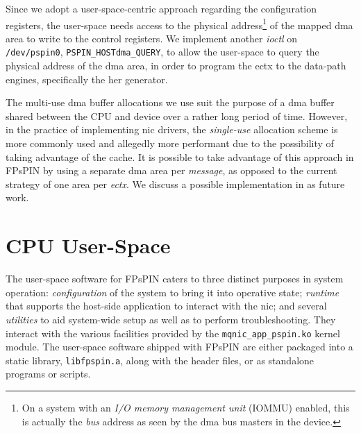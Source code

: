 Since we adopt a user-space-centric approach regarding the configuration registers, the user-space needs access to the physical address\footnote{On a system with an \emph{I/O memory management unit} (IOMMU) enabled, this is actually the \emph{bus} address as seen by the \ac{dma} bus masters in the device.} of the mapped \ac{dma} area to write to the control registers.  We implement another \emph{ioctl} on \texttt{/dev/pspin0}, \texttt{PSPIN\_\-HOST\ac{dma}\_\-QUERY}, to allow the user-space to query the physical address of the \ac{dma} area, in order to program the \ac{ectx} to the data-path engines, specifically the \ac{her} generator.

The multi-use \ac{dma} buffer allocations we use suit the purpose of a \ac{dma} buffer shared between the CPU and device over a rather long period of time.  However, in the practice of implementing \ac{nic} drivers, the \emph{single-use} allocation scheme is more commonly used and allegedly more performant due to the possibility of taking advantage of the cache.  It is possible to take advantage of this approach in FPsPIN by using a separate \ac{dma} area per \emph{message}, as opposed to the current strategy of one area per \emph{\ac{ectx}}.  We discuss a possible implementation in  as future work.

\section{CPU User-Space} \label{sec:sw-lib}

The user-space software for FPsPIN caters to three distinct purposes in system operation: \emph{configuration} of the system to bring it into operative state; \emph{runtime} that supports the host-side application to interact with the \ac{nic}; and several \emph{utilities} to aid system-wide setup as well as to perform troubleshooting.  They interact with the various facilities provided by the \texttt{mqnic\_\-app\_\-pspin.ko} kernel module.  The user-space software shipped with FPsPIN are either packaged into a static library, \texttt{libfpspin.a}, along with the header files, or as standalone programs or scripts.

